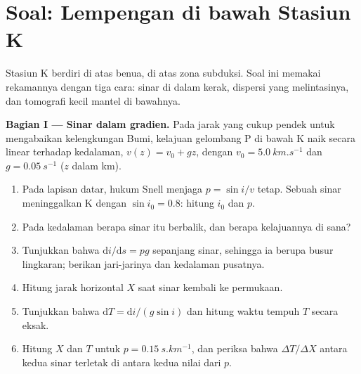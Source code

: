 \section{Soal: Lempengan di bawah Stasiun K}

\begin{problem}
\label{pb:b3:seismology-imaging:1}
Stasiun K berdiri di atas benua, di atas zona subduksi. Soal ini memakai rekamannya
dengan tiga cara: sinar di dalam kerak, dispersi  yang melintasinya,
dan tomografi kecil mantel di bawahnya.

\medskip
\noindent\textbf{Bagian I --- Sinar dalam gradien.} Pada jarak yang cukup pendek untuk
mengabaikan kelengkungan Bumi, kelajuan gelombang P di bawah K naik secara linear terhadap kedalaman,
$v(z) = v_0 + gz$, dengan $v_0 = \qty{5.0}{km.s^{-1}}$ dan
$g = \qty{0.05}{s^{-1}}$ ($z$ dalam km).
\begin{enumerate}
  \item Pada lapisan datar, hukum Snell menjaga $p = \sin i/v$ tetap. Sebuah sinar meninggalkan
        K dengan $\sin i_0 = 0.8$: hitung $i_0$ dan $p$.
  \item Pada kedalaman berapa sinar itu berbalik, dan berapa kelajuannya di sana?
  \item Tunjukkan bahwa $\mathrm di/\mathrm ds = pg$ sepanjang sinar, sehingga ia berupa
        busur lingkaran; berikan jari-jarinya dan kedalaman pusatnya.
  \item Hitung jarak horizontal $X$ saat sinar kembali ke
        permukaan.
  \item Tunjukkan bahwa $\mathrm dT = \mathrm di/(g\sin i)$ dan hitung waktu
        tempuh $T$ secara eksak.
  \item Hitung $X$ dan $T$ untuk $p = \qty{0.15}{s.km^{-1}}$, dan periksa bahwa
        $\Delta T/\Delta X$ antara kedua sinar terletak di antara kedua nilai
        dari $p$.
\end{enumerate}


\end{problem}
